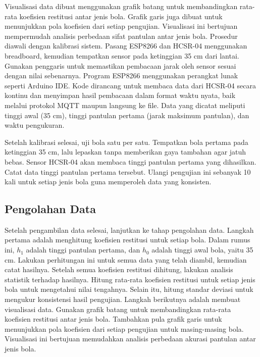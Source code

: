 Visualisasi data dibuat menggunakan grafik batang untuk membandingkan rata-rata koefisien restitusi antar jenis bola. Grafik garis juga dibuat untuk menunjukkan pola koefisien dari setiap pengujian. Visualisasi ini bertujuan mempermudah analisis perbedaan sifat pantulan antar jenis bola.
Prosedur diawali dengan kalibrasi sistem. Pasang ESP8266 dan HCSR-04 menggunakan breadboard, kemudian tempatkan sensor pada ketinggian 35 cm dari lantai. Gunakan penggaris untuk memastikan pembacaan jarak oleh sensor sesuai dengan nilai sebenarnya. Program ESP8266 menggunakan perangkat lunak seperti Arduino IDE. Kode dirancang untuk membaca data dari HCSR-04 secara kontinu dan menyimpan hasil pembacaan dalam format waktu nyata, baik melalui protokol MQTT maupun langsung ke file. Data yang dicatat meliputi tinggi awal (35 cm), tinggi pantulan pertama (jarak maksimum pantulan), dan waktu pengukuran.

Setelah kalibrasi selesai, uji bola satu per satu. Tempatkan bola pertama pada ketinggian 35 cm, lalu lepaskan tanpa memberikan gaya tambahan agar jatuh bebas. Sensor HCSR-04 akan membaca tinggi pantulan pertama yang dihasilkan. Catat data tinggi pantulan pertama tersebut. Ulangi pengujian ini sebanyak 10 kali untuk setiap jenis bola guna memperoleh data yang konsisten.

\subsection{Pengolahan Data}
Setelah pengambilan data selesai, lanjutkan ke tahap pengolahan data. Langkah pertama adalah menghitung koefisien restitusi untuk setiap bola. Dalam rumus ini, \( h_1 \) adalah tinggi pantulan pertama, dan \( h_0 \) adalah tinggi awal bola, yaitu 35 cm. Lakukan perhitungan ini untuk semua data yang telah diambil, kemudian catat hasilnya.
Setelah semua koefisien restitusi dihitung, lakukan analisis statistik terhadap hasilnya. Hitung rata-rata koefisien restitusi untuk setiap jenis bola untuk mengetahui nilai tengahnya. Selain itu, hitung standar deviasi untuk mengukur konsistensi hasil pengujian.
Langkah berikutnya adalah membuat visualisasi data. Gunakan grafik batang untuk membandingkan rata-rata koefisien restitusi antar jenis bola. Tambahkan pula grafik garis untuk menunjukkan pola koefisien dari setiap pengujian untuk masing-masing bola. Visualisasi ini bertujuan memudahkan analisis perbedaan akurasi pantulan antar jenis bola.
